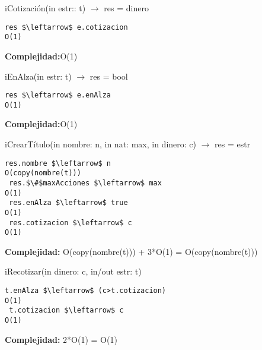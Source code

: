 iCotizaci\'on(in estr:: t) $\rightarrow$ res = dinero
\begin{lstlisting}[mathescape]
 res $\leftarrow$ e.cotizacion                                                    O(1)
\end{lstlisting}
\textbf{Complejidad:}O(1)


iEnAlza(in estr: t) $\rightarrow$ res = bool
\begin{lstlisting}[mathescape]
 res $\leftarrow$ e.enAlza                                                        O(1)
\end{lstlisting}
\textbf{Complejidad:}O(1)


iCrearT\'itulo(in nombre: n, in nat: max, in dinero: c) $\rightarrow$ res = estr
\begin{lstlisting}[mathescape]
 res.nombre $\leftarrow$ n                                                        O(copy(nombre(t)))
 res.$\#$maxAcciones $\leftarrow$ max                                                 O(1)
 res.enAlza $\leftarrow$ true                                                     O(1)
 res.cotizacion $\leftarrow$ c                                                    O(1)
\end{lstlisting}
\textbf{Complejidad:} O(copy(nombre(t))) + 3*O(1) = O(copy(nombre(t)))


iRecotizar(in dinero: c, in/out estr: t)
\begin{lstlisting}[mathescape]
 t.enAlza $\leftarrow$ (c>t.cotizacion)                                           O(1)
 t.cotizacion $\leftarrow$ c                                                      O(1)
\end{lstlisting}
\textbf{Complejidad:} 2*O(1) = O(1)